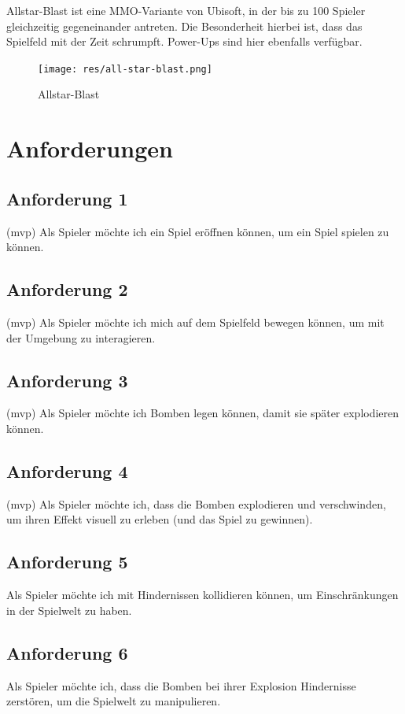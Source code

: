 \documentclass[conference]{IEEEtran}
\begin{document}
Allstar-Blast \cite{allstarblast} ist eine MMO-Variante von Ubisoft, in der bis zu 100 Spieler gleichzeitig gegeneinander antreten. Die Besonderheit hierbei ist, dass das Spielfeld mit der Zeit schrumpft. Power-Ups sind hier ebenfalls verfügbar.
\begin{figure}[H]
    \centering
    \texttt{[image: res/all-star-blast.png]}
    \caption{Allstar-Blast}
\end{figure}


\section{Anforderungen}

\subsection{Anforderung 1} (mvp)
Als Spieler möchte ich ein Spiel eröffnen können, um ein Spiel spielen zu können.

\subsection{Anforderung 2} (mvp)
Als Spieler möchte ich mich auf dem Spielfeld bewegen können, um mit der Umgebung zu interagieren.

\subsection{Anforderung 3} (mvp)
Als Spieler möchte ich Bomben legen können, damit sie später explodieren können.

\subsection{Anforderung 4} (mvp)
Als Spieler möchte ich, dass die Bomben explodieren und verschwinden, um ihren Effekt visuell zu erleben (und das Spiel zu gewinnen).

\subsection{Anforderung 5} 
Als Spieler möchte ich mit Hindernissen kollidieren können, um Einschränkungen in der Spielwelt zu haben.

\subsection{Anforderung 6}
Als Spieler möchte ich, dass die Bomben bei ihrer Explosion Hindernisse zerstören, um die Spielwelt zu manipulieren.
\end{document}
